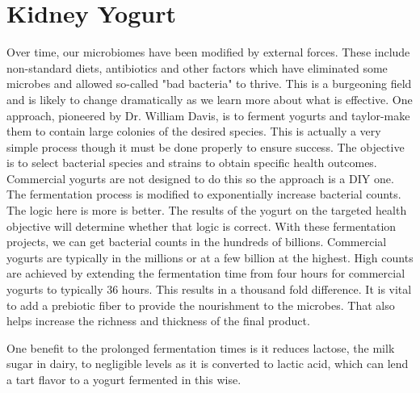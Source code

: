 \section{Kidney Yogurt}
Over time, our microbiomes have been modified by external forces. These include non-standard diets, antibiotics and other factors which have eliminated some microbes and allowed so-called "bad bacteria" to thrive. This is a burgeoning field and is likely to change dramatically as we learn more about what is effective. One approach, pioneered by Dr. William Davis, is to ferment yogurts and taylor-make them to contain large colonies of the desired species. This is actually a very simple process though it must be done properly to ensure success. The objective is to select bacterial species and strains to obtain specific health outcomes. Commercial yogurts are not designed to do this so the approach is a DIY one. The fermentation process is modified to  exponentially increase bacterial counts. The logic here is more is better. The results of the yogurt on the targeted health objective will determine whether that logic is correct. With these fermentation projects, we can get bacterial counts in the hundreds of billions. Commercial yogurts are typically in the millions or at a few billion at the highest. High counts are achieved by extending the fermentation time from four hours for commercial yogurts to typically 36 hours. This results in a thousand fold difference. It is vital to add a prebiotic fiber to provide the nourishment to the microbes. That also helps increase the richness and thickness of the final product.

One benefit to the prolonged fermentation times is it reduces lactose, the milk sugar in dairy, to negligible levels as it is converted to lactic acid, which can lend a tart flavor to a yogurt fermented in this wise.
